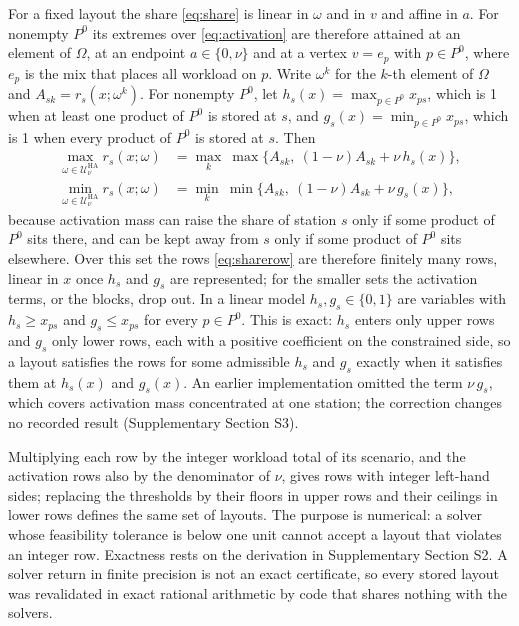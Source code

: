 For a fixed layout the share \eqref{eq:share} is linear in $\omega$ and in $v$ and affine in $a$. For nonempty $P^0$ its extremes over \eqref{eq:activation} are therefore attained at an element of $\Omega$, at an endpoint $a\in\{0,\nu\}$ and at a vertex $v=e_p$ with $p\in P^0$, where $e_p$ is the mix that places all workload on $p$. Write $\omega^k$ for the $k$-th element of $\Omega$ and $A_{sk}=r_s(x;\omega^k)$. For nonempty $P^0$, let $h_s(x)=\max_{p\in P^0}x_{ps}$, which is 1 when at least one product of $P^0$ is stored at $s$, and $g_s(x)=\min_{p\in P^0}x_{ps}$, which is 1 when every product of $P^0$ is stored at $s$. Then
\begin{align}
\max_{\omega\in\mathcal U^{\mathrm{HA}}_\nu}r_s(x;\omega) &= \max_{k}\ \max\bigl\{A_{sk},\ (1-\nu)A_{sk}+\nu\,h_s(x)\bigr\}, \label{eq:maxshare}\\
\min_{\omega\in\mathcal U^{\mathrm{HA}}_\nu}r_s(x;\omega) &= \min_{k}\ \min\bigl\{A_{sk},\ (1-\nu)A_{sk}+\nu\,g_s(x)\bigr\}, \label{eq:minshare}
\end{align}
because activation mass can raise the share of station $s$ only if some product of $P^0$ sits there, and can be kept away from $s$ only if some product of $P^0$ sits elsewhere. Over this set the rows \eqref{eq:sharerow} are therefore finitely many rows, linear in $x$ once $h_s$ and $g_s$ are represented; for the smaller sets the activation terms, or the blocks, drop out. In a linear model $h_s,g_s\in\{0,1\}$ are variables with $h_s\ge x_{ps}$ and $g_s\le x_{ps}$ for every $p\in P^0$. This is exact: $h_s$ enters only upper rows and $g_s$ only lower rows, each with a positive coefficient on the constrained side, so a layout satisfies the rows for some admissible $h_s$ and $g_s$ exactly when it satisfies them at $h_s(x)$ and $g_s(x)$. An earlier implementation omitted the term $\nu\,g_s$, which covers activation mass concentrated at one station; the correction changes no recorded result (Supplementary Section S3).

Multiplying each row by the integer workload total of its scenario, and the activation rows also by the denominator of $\nu$, gives rows with integer left-hand sides; replacing the thresholds by their floors in upper rows and their ceilings in lower rows defines the same set of layouts. The purpose is numerical: a solver whose feasibility tolerance is below one unit cannot accept a layout that violates an integer row. Exactness rests on the derivation in Supplementary Section S2. A solver return in finite precision is not an exact certificate, so every stored layout was revalidated in exact rational arithmetic by code that shares nothing with the solvers.

